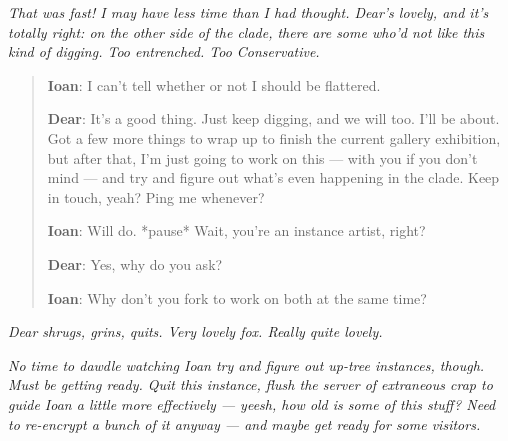 \emph{That was fast! I may have less time than I had thought. Dear's lovely, and it's totally right: on the other side of the clade, there are some who'd not like this kind of digging. Too entrenched. Too Conservative.}

\begin{quote}
\textbf{Ioan}: I can't tell whether or not I should be flattered.

\textbf{Dear}: It's a good thing. Just keep digging, and we will too. I'll be about. Got a few more things to wrap up to finish the current gallery exhibition, but after that, I'm just going to work on this — with you if you don't mind — and try and figure out what's even happening in the clade. Keep in touch, yeah? Ping me whenever?

\textbf{Ioan}: Will do. *pause* Wait, you're an instance artist, right?

\textbf{Dear}: Yes, why do you ask?

\textbf{Ioan}: Why don't you fork to work on both at the same time?
\end{quote}

\emph{Dear shrugs, grins, quits. Very lovely fox. Really quite lovely.}

\emph{No time to dawdle watching Ioan try and figure out up-tree instances, though. Must be getting ready. Quit this instance, flush the server of extraneous crap to guide Ioan a little more effectively — yeesh, how old is some of this stuff? Need to re-encrypt a bunch of it anyway — and maybe get ready for some visitors.}
